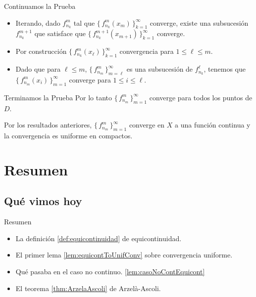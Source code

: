 \documentclass[utf8]{beamer}
\theoremstyle{plain}
\theoremstyle{definition}
\theoremstyle{remark}
\numberwithin{equation}{section}
\newcommand{\set}[1]{\{\,#1\,\}}    %
\renewcommand{\l}{\ell}                   %
\renewcommand{\leq}{\leqslant}          %
\newcommand{\sucm}{_{m=1}^\infty} %
\newcommand{\suck}{_{k=1}^\infty} %
\begin{document}
\begin{frame}{Continuamos la Prueba}
  \begin{itemize}
    \item Iterando, dado $f_{n_k}^m$ tal que $\set{f_{n_k}^m(x_m)}\suck$ converge, existe una subsucesión $f_{n_k}^{m+1}$ que satisface que $\set{f_{n_k}^{m+1}(x_{m+1})}\suck$ converge.
    \item Por construcción $\set{f_{n_k}^m(x_\l)}\suck$ convergencia para $1\leq \l\leq m$.
    \item Dado que para $\l\leq m$, $\set{f_{n_m}^m}_{m=\l}^\infty$ es una subsucesión de $f_{n_k}^\l$, tenemos que $\set{f_{n_m}^m(x_i)}_{m=1}^\infty$ converge para $1\leq i\leq \l$.
  \end{itemize}
\end{frame}

\begin{frame}{Terminamos la Prueba}
  Por lo tanto $\set{f_{n_m}^m}\sucm$ converge para todos los puntos de $D$.\par 
  Por los resultados anteriores, $\set{f_{n_m}^m}\sucm$ converge en $X$ a una función continua y la convergencia es uniforme en compactos.
\end{frame}


\section*{Resumen}

\subsection*{Qu\'e vimos hoy}
\begin{frame}{Resumen}

  \begin{itemize}
  \item La definición \ref{def:equicontinuidad} de equicontinuidad.
  \item El primer lema \ref{lem:equicontToUnifConv} sobre convergencia uniforme.
  \item Qué pasaba en el caso no continuo. \ref{lem:casoNoContEquicont}
  \item El teorema \ref{thm:ArzelaAscoli} de Arzelà-Ascoli.
  \end{itemize}
  
\end{frame}
\end{document}
